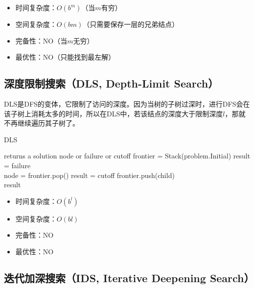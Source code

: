 \begin{itemize}
    \item 时间复杂度：$ O(b^m) $（当$ m $有穷）
    \item 空间复杂度：$ O(bm) $（只需要保存一层的兄弟结点）
    \item 完备性：NO（当$ m $无穷）
    \item 最优性：NO（只能找到最左解）
\end{itemize}

\vspace{0.5cm}

\subsection{深度限制搜索（DLS, Depth-Limit Search）}

DLS是DFS的变体，它限制了访问的深度。因为当树的子树过深时，进行DFS会在该子树上消耗太多的时间，所以在DLS中，若该结点的深度大于限制深度$ l $，那就不再继续遍历其子树了。\\

\begin{algorithm}[H]
    \caption{DLS}
    \begin{algorithmic}[1]
         returns a solution node or failure or cutoff
        \State frontier = Stack(problem.Initial)
        \State result = failure
        \\
        \State node = frontier.pop()
        \State result = cutoff
        \State frontier.push(child)
        \EndFor
        \EndIf
        \EndWhile
        \\
        \State \Return result
        \EndProcedure
    \end{algorithmic}
\end{algorithm}

\begin{itemize}
    \item 时间复杂度：$ O(b^l) $
    \item 空间复杂度：$ O(bl) $
    \item 完备性：NO
    \item 最优性：NO
\end{itemize}

\vspace{0.5cm}

\subsection{迭代加深搜索（IDS, Iterative Deepening Search）}

